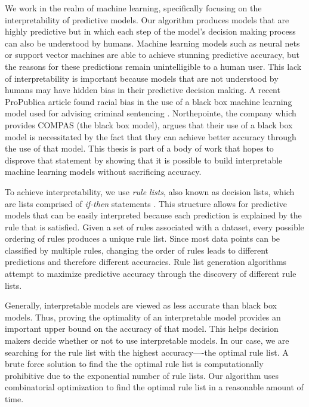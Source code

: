 \documentclass[]{report}
\theoremstyle{definition}
\begin{document}
We work in the realm of machine learning, specifically focusing on the interpretability of predictive models.
Our algorithm produces models that are highly predictive but in which each step of the model's decision making process can also be understood by humans.
Machine learning models such as neural nets or support vector machines are able to achieve stunning predictive accuracy, but the reasons for these predictions remain unintelligible to a human user.
This lack of interpretability is important because models that are not understood by humans may have hidden bias in their predictive decision making.
A recent ProPublica article found racial bias in the use of a black box machine learning model used for advising criminal sentencing \cite{LarsonMaKiAn16}.
Northepointe, the company which provides COMPAS (the black box model), argues that their use of a black box model is necessitated by the fact that they can achieve better accuracy through the use of that model.
This thesis is part of a body of work that hopes to disprove that statement by showing that it is possible to build interpretable machine learning models without sacrificing accuracy.

To achieve interpretability, we use \emph{rule lists}, also known as decision lists, which are lists comprised of \emph{if-then} statements \cite{Rivest87}. 
This structure allows for predictive models that can be easily interpreted because each prediction is explained by the rule that is satisfied. 
Given a set of rules associated with a dataset, every possible ordering of rules produces a unique rule list.
Since most data points can be classified by multiple rules, changing the order of rules leads to different predictions and therefore different accuracies. 
Rule list generation algorithms attempt to maximize predictive accuracy through the discovery of different rule lists.

Generally, interpretable models are viewed as less accurate than black box models.
Thus, proving the optimality of an interpretable model provides an important upper bound on the accuracy of that model.
This helps decision makers decide whether or not to use interpretable models.
In our case, we are searching for the rule list with the highest accuracy----the optimal rule list. 
A brute force solution to find the the optimal rule list is computationally prohibitive due to the exponential number of rule lists.
Our algorithm uses combinatorial optimization to find the optimal rule list in a reasonable amount of time.
\end{document}
